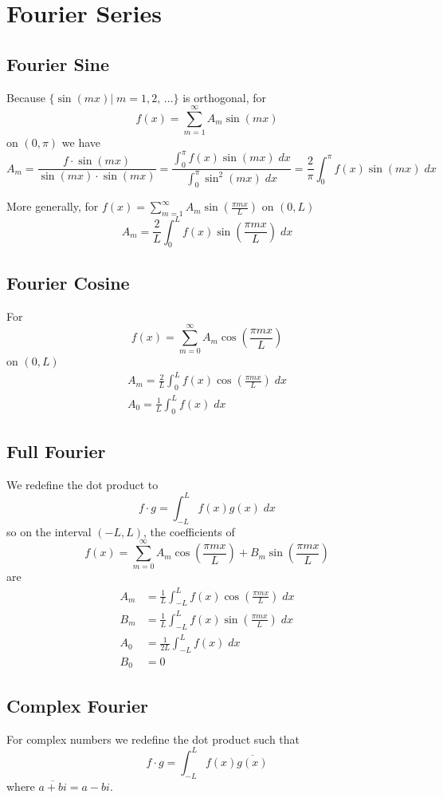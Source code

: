 \documentclass[10pt]{article}
\begin{document}
\section{Fourier Series}
\subsection{Fourier Sine}
Because $\{\sin(mx) |\; m =1,2,\, ...\}$ is orthogonal, for 
\[f(x) = \sum_{m=1}^\infty A_m \sin(mx)\]
on $(0, \pi)$ we have 
\[A_m = \frac{f \cdot \sin(mx)}{\sin(mx) \cdot \sin(mx)} = \frac{\int_0^\pi f(x)\sin(mx)\; dx}{\int_0^\pi \sin^2(mx)\; dx} = \frac{2}{\pi}\int_0^\pi f(x)\sin(mx)\; dx\]

More generally, for $f(x) = \sum_{m=1}^\infty A_m \sin(\frac{\pi mx}{L})$ on $(0, L)$ 
\[A_m = \frac{2}{L}\int_0^L f(x)\sin(\frac{\pi mx}{L})\; dx\]

\subsection{Fourier Cosine}
For 
\[f(x) = \sum_{m=0}^\infty A_m \cos(\frac{\pi mx}{L})\] 
on $(0, L)$
\begin{gather*}
    A_m = \frac{2}{L}\int_0^L f(x)\cos(\frac{\pi mx}{L})\; dx\\
    A_0 = \frac{1}{L}\int_0^L f(x)\; dx
\end{gather*}

\subsection{Full Fourier}
We redefine the dot product to 
\[f\cdot g = \int_{-L}^L f(x)g(x)\; dx\]
so on the interval $(-L, L)$, the coefficients of 
\[f(x) = \sum_{m=0}^\infty A_m \cos(\frac{\pi mx}{L}) + B_m \sin(\frac{\pi mx}{L})\]
are 
\begin{align*}
    A_m &= \frac{1}{L}\int_{-L}^L f(x)\cos(\frac{\pi mx}{L})\; dx\\
    B_m &= \frac{1}{L}\int_{-L}^L f(x)\sin(\frac{\pi mx}{L})\; dx\\
    A_0 &= \frac{1}{2L}\int_{-L}^L f(x)\; dx\\
    B_0 &= 0
\end{align*}

\subsection{Complex Fourier}
For complex numbers we redefine the dot product such that 
\[f\cdot g = \int_{-L}^L f(x)\overline{g(x)}\]
where $\overline{a +bi} = a-bi$. 
\end{document}
